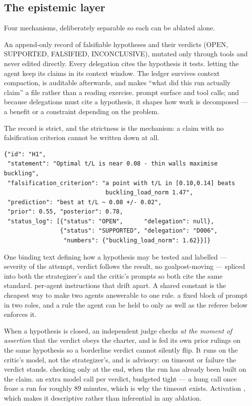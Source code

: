 \subsection{The epistemic layer}

Four mechanisms, deliberately separable so each can be ablated alone.

{An append-only record of falsifiable hypotheses and their verdicts (OPEN,
SUPPORTED, FALSIFIED, INCONCLUSIVE), mutated only through tools and never
edited directly. Every delegation cites the hypothesis it tests.}
{letting the agent keep its claims in its context window. The ledger survives
context compaction, is auditable afterwards, and makes ``what did this run
actually claim'' a file rather than a reading exercise.}
{prompt surface and tool calls; and because delegations must cite a hypothesis,
it shapes how work is decomposed --- a benefit or a constraint depending on the
problem.}

The record is strict, and the strictness is the mechanism: a claim with no
falsification criterion cannot be written down at all.

\begin{verbatim}
{"id": "H1",
 "statement": "Optimal t/L is near 0.08 - thin walls maximise buckling",
 "falsification_criterion": "a point with t/L in [0.10,0.14] beats
                             buckling_load_norm 1.47",
 "prediction": "best at t/L ~ 0.08 +/- 0.02",
 "prior": 0.55, "posterior": 0.78,
 "status_log": [{"status": "OPEN",      "delegation": null},
                {"status": "SUPPORTED", "delegation": "D006",
                 "numbers": {"buckling_load_norm": 1.62}}]}
\end{verbatim}

{One binding text defining how a hypothesis may be tested and labelled ---
severity of the attempt, verdict follows the result, no goalpost-moving ---
spliced into both the strategizer's and the critic's prompts so both cite the
same standard.}
{per-agent instructions that drift apart. A shared constant is the cheapest way
to make two agents answerable to one rule.}
{a fixed block of prompt in two roles, and a rule the agent can be held to only
as well as the referee below enforces it.}

{When a hypothesis is closed, an independent judge checks \emph{at the moment
of assertion} that the verdict obeys the charter, and is fed its own prior
rulings on the same hypothesis so a borderline verdict cannot silently flip. It
runs on the critic's model, not the strategizer's, and is advisory: on timeout
or failure the verdict stands.}
{checking only at the end, when the run has already been built on the claim.}
{an extra model call per verdict, budgeted tight --- a hung call once froze a
run for roughly 89 minutes, which is why the timeout exists. Activation
, which makes it descriptive
rather than inferential in any ablation.}

